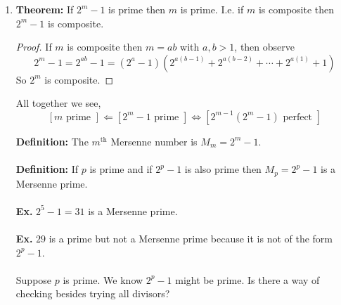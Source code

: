 \documentclass[class=article, crop=false]{standalone}
\begin{document}
\begin{enumerate}
\begin{proof}
	$ $\\
	$\Leftarrow$: Suppose $2^m -1$ is prime with $m\geq 2$. Define $n=2^{m-1}(2^m -1)$ and
	claim that $n$ is perfect. Claim $\sigma(n) =2n$, look at $\sigma(n) = \sigma(2^{m-1} (2^m -1))$
	well, $2^m -1\geq 3$ and is odd, $2^{m-1}$ is a power of 2, so $\gcd(2^{m-1}, 2^m-1)=1$. So,
	$\sigma(2^{m-1} (2^m -1)) = \sigma(2^{m-1}) \sigma(2^m -1)$. Then observe from $5.2.2a$,
	$$\sigma(2^{m-1}) = \frac{2^m -1}{2-1} = 2^m-1$$
	and $$\sigma(2^m -1) = 1+(2^m -1)$$
	because $2^m -1$ is prime.
	So $\sigma(2^{m-1}) \sigma(2^m -1) = (2^m -1)(2^m) = 2\cdot 2^{m-1}(2^m -1)=2n$.
	Thus, $\sigma(n) = 2n$. \\

	$\Rightarrow$: This direction is fairly lengthy and will be omitted. It is
	in the text if you're interested.
\end{proof}

\item \textbf{Theorem:} If $2^m -1$ is prime then $m$ is prime. I.e. if $m$ is composite 
then $2^m - 1$ is composite.
\begin{proof}
	If $m$ is composite then $m=ab$ with $a,b>1$, then observe
	$$2^m -1 = 2^{ab}-1 = (2^{a} -1)(2^{a(b-1)} + 2^{a(b-2)}+ \cdots + 2^{a(1)} + 1)$$
	So $2^m$ is composite.
\end{proof}

\noindent All together we see,
$$\left[m\mbox{ prime } \right] \Leftarrow \left[2^{m}-1 \mbox{ prime }\right] \iff \left[2^{m-1}(2^m -1) \mbox{ perfect }\right]$$

\textbf{Definition:} The $m^{\text{th}}$ Mersenne number is $M_m = 2^m - 1$. \\\\
\textbf{Definition:} If $p$ is prime and if $2^p -1$ is also prime then $M_p = 2^p -1$ is a 
Mersenne prime. \\\\
\textbf{Ex.} $2^5 -1 =31$ is a Mersenne prime. \\\\
\textbf{Ex.} $29$ is a prime but not a Mersenne prime because it is not of the form $2^p -1$. \\\\
Suppose $p$ is prime. We know $2^p -1$ might be prime.
Is there a way of checking besides trying all divisors? 


\end{enumerate}
\end{document}
